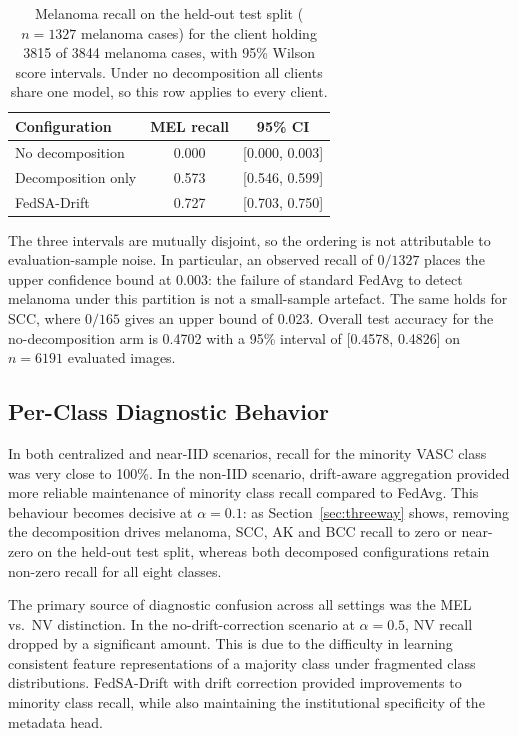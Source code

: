 \documentclass{ieeeaccess}
\newcommand{\sadrift}{FedSA-Drift}
\begin{document}
\begin{table}[h]
\centering
\caption[Melanoma recall with confidence intervals]{Melanoma recall on the held-out test split ($n{=}1327$ melanoma cases) for the client holding 3815 of 3844 melanoma cases, with 95\% Wilson score intervals. Under no decomposition all clients share one model, so this row applies to every client.}
\label{tab:mel_ci}
\begin{tabular}{lcc}
\hline
\textbf{Configuration} & \textbf{MEL recall} & \textbf{95\% CI} \\
\hline
No decomposition   & 0.000 & [0.000, 0.003] \\
Decomposition only & 0.573 & [0.546, 0.599] \\
\sadrift{}         & 0.727 & [0.703, 0.750] \\
\hline
\end{tabular}
\end{table}

The three intervals are mutually disjoint, so the ordering is not attributable to evaluation-sample noise. In particular, an observed recall of $0/1327$ places the upper confidence bound at 0.003: the failure of standard FedAvg to detect melanoma under this partition is not a small-sample artefact. The same holds for SCC, where $0/165$ gives an upper bound of 0.023. Overall test accuracy for the no-decomposition arm is 0.4702 with a 95\% interval of [0.4578, 0.4826] on $n = 6191$ evaluated images.

\subsection{Per-Class Diagnostic Behavior}

In both centralized and near-IID scenarios, recall for the minority VASC class was very close to 100\%. In the non-IID scenario, drift-aware aggregation provided more reliable maintenance of minority class recall compared to FedAvg. This behaviour becomes decisive at $\alpha{=}0.1$: as Section~\ref{sec:threeway} shows, removing the decomposition drives melanoma, SCC, AK and BCC recall to zero or near-zero on the held-out test split, whereas both decomposed configurations retain non-zero recall for all eight classes.

The primary source of diagnostic confusion across all settings was the MEL vs.\ NV distinction. In the no-drift-correction scenario at $\alpha{=}0.5$, NV recall dropped by a significant amount. This is due to the difficulty in learning consistent feature representations of a majority class under fragmented class distributions. \sadrift{} with drift correction provided improvements to minority class recall, while also maintaining the institutional specificity of the metadata head.
\end{document}
